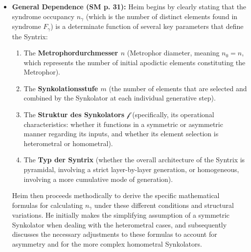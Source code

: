 \documentclass[12pt]{article}
\newcommand{\synkolator}{\mathcal{f}}
\newcommand{\synkolationsstufe}{m}
\newcommand{\syndrom}{F}
\begin{document}
\begin{itemize}
    \item \textbf{General Dependence (SM p. 31):} Heim begins by clearly stating that the syndrome occupancy \( n_\gamma \) (which is the number of distinct elements found in syndrome \( \syndrom_\gamma \)) is a determinate function of several key parameters that define the Syntrix:
    \begin{enumerate}
        \item The \textbf{Metrophordurchmesser \( n \)} (Metrophor diameter, meaning \( n_0 = n \), which represents the number of initial apodictic elements constituting the Metrophor).
        \item The \textbf{Synkolationsstufe \( \synkolationsstufe \)} (the number of elements that are selected and combined by the Synkolator at each individual generative step).
        \item The \textbf{Struktur des Synkolators \( \synkolator \)} (specifically, its operational characteristics: whether it functions in a symmetric or asymmetric manner regarding its inputs, and whether its element selection is heterometral or homometral).
        \item The \textbf{Typ der Syntrix} (whether the overall architecture of the Syntrix is pyramidal, involving a strict layer-by-layer generation, or homogeneous, involving a more cumulative mode of generation).
    \end{enumerate}

    Heim then proceeds methodically to derive the specific mathematical formulas for calculating \( n_\gamma \) under these different conditions and structural variations. He initially makes the simplifying assumption of a symmetric Synkolator when dealing with the heterometral cases, and subsequently discusses the necessary adjustments to these formulas to account for asymmetry and for the more complex homometral Synkolators.


\end{itemize}
\end{document}
